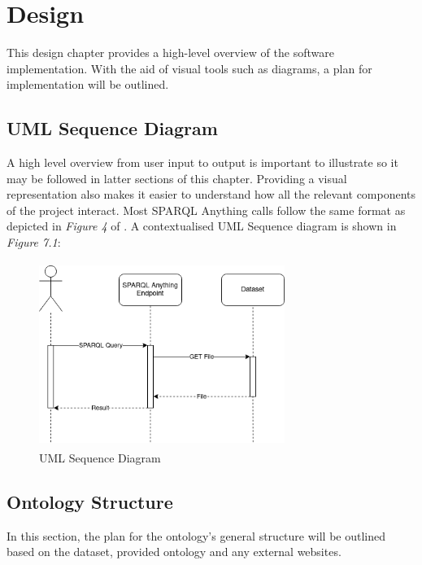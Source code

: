 \chapter{Design}
This design chapter provides a high-level overview of the software implementation. With the aid of visual tools such as diagrams, a plan for implementation will be outlined. 

\section{UML Sequence Diagram}
\hspace{0.5cm} A high level overview from user input to output is important to illustrate so it may be followed in latter sections of this chapter. Providing a visual representation also makes it easier to understand how all the relevant components of the project interact. Most SPARQL Anything calls follow the same format as depicted in \textit{Figure 4} of \cite{asprino2023knowledge}. A contextualised UML Sequence diagram is shown in \textit{Figure 7.1}: 

\begin{figure}
\begin{center}
    \includegraphics[width=8cm, height=6cm]{Images/UMLSequenceDiagram.drawio.png}
\end{center}
\vspace{-0.4cm}
\caption{UML Sequence Diagram}
\end{figure}

\section{Ontology Structure}
\hspace{0.5cm} In this section, the plan for the ontology's general structure will be outlined based on the dataset, provided ontology and any external websites. 

